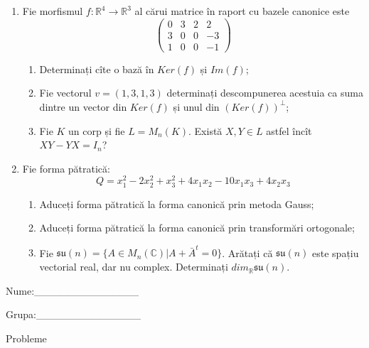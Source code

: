 \documentclass{article}
\begin{document}
\begin{enumerate}
 \item Fie morfismul $f:\mathbb{R}^4 \to \mathbb{R}^3$ al cărui matrice în raport cu bazele canonice este
$$\begin{pmatrix}
0&3&2&2\\
3&0&0&-3\\
1&0&0&-1
\end{pmatrix}$$

\begin{enumerate}
\item Determinați cîte o bază în $Ker(f)$ și $Im(f)$;
\item Fie vectorul $v=(1,3,1,3)$ determinați descompunerea acestuia ca suma dintre un vector din $Ker(f)$ și unul din $(Ker(f))^\perp$;
\item Fie $K$ un corp și fie $L=M_n(K)$. Există $X,Y \in L$ astfel încît $XY-YX=I_n$?  
\end{enumerate}
\item Fie forma pătratică:
$$Q= x_1^2-2x_2^2+x_3^2+4x_1x_2-10x_1x_3+4x_2x_3$$

\begin{enumerate}
\item Aduceți forma pătratică la forma canonică prin metoda Gauss;
\item Aduceți forma pătratică la forma canonică prin transformări ortogonale;
\item Fie $\mathfrak{su}(n)=\{ A \in M_n(\mathbb{C}) | A+\bar{A}^t=0\}$. Arătați că $\mathfrak{su}(n)$ este spațiu vectorial real, dar nu complex.
Determinați $dim_{\mathbb{R}}\mathfrak{su}(n)$.
\end{enumerate}
\end{enumerate}
\newpage
\begin{flushright}
Nume:\_\_\_\_\_\_\_\_\_\_\_\_\_\_
 
 
Grupa:\_\_\_\_\_\_\_\_\_\_\_\_\_\_
\end{flushright}
\begin{center}
\vspace{2cm}
{\Large Probleme}
\vspace{2cm}
\end{center}
\end{document}
